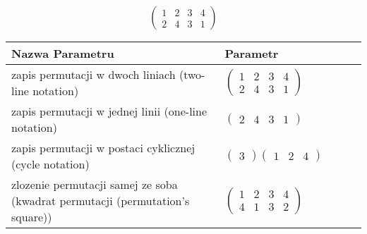 \documentclass[12pt]{article}
\begin{document}
\subsection{}
\begin{center}
\[
\begin{pmatrix}
	1 & 2 & 3 & 4 \\ 
	2 & 4 & 3 & 1 
\end{pmatrix}
\]

\begin{tabular}{|m{0.6\linewidth}|m{0.4\linewidth}|}
	\hline
	Nazwa Parametru & Parametr \\
	\hline
	zapis permutacji w dwoch liniach (two-line notation) & $\begin{pmatrix} 1 & 2 & 3 & 4 \\ 
2 & 4 & 3 & 1 \end{pmatrix}$ \\ 
	\hline
	zapis permutacji w jednej linii (one-line notation) & $\begin{pmatrix} 2 & 4 & 3 & 1 \end{pmatrix}$ \\ 
	\hline
	zapis permutacji w postaci cyklicznej (cycle notation) & $\begin{pmatrix} 3 \end{pmatrix} \begin{pmatrix} 1 & 2 & 4 \end{pmatrix} $ \\ 
	\hline
	zlozenie permutacji samej ze soba (kwadrat permutacji (permutation's square)) & $\begin{pmatrix} 1 & 2 & 3 & 4 \\ 
4 & 1 & 3 & 2 \end{pmatrix}$ \\ 
	\hline
\end{tabular}
\end{center}
\end{document}
